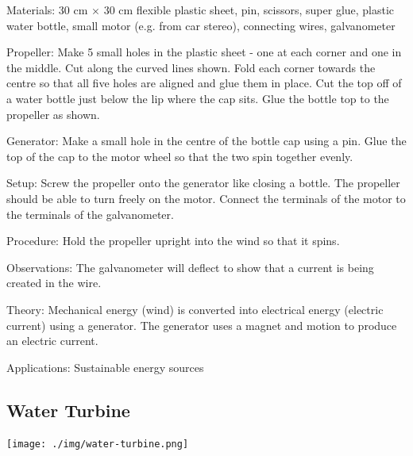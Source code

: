 \begin{multicols}{2}
\begin{description*}
\item[Materials:]{30 cm $\times$ 30 cm flexible plastic sheet, pin, scissors, super glue, plastic water bottle, small motor (e.g. from car stereo), connecting wires, galvanometer}
\item[Propeller:]{Make 5 small holes in the plastic sheet - one at each corner and one in the middle. Cut along the curved lines shown. Fold each corner towards the centre so that all five holes are aligned and glue them in place. Cut the top off of a water bottle just below the lip where the cap sits. Glue the bottle top to the propeller as shown. }
\item[Generator:]{Make a small hole in the centre of the bottle cap using a pin. Glue the top of the cap to the motor wheel so that the two spin together evenly.}
\item[Setup:]{Screw the propeller onto the generator like closing a bottle. The propeller should be able to turn freely on the motor. Connect the terminals of the motor to the terminals of the galvanometer.}
\item[Procedure:]{Hold the propeller upright into the wind so that it spins.}
\item[Observations:]{The galvanometer will deflect to show that a current is being created in the wire.}
\item[Theory:]{Mechanical energy (wind) is converted into electrical energy (electric current) using a generator. The generator uses a magnet and motion to produce an electric current.}
\item[Applications:]{Sustainable energy sources}
\end{description*}

\columnbreak

\subsection{Water Turbine}
\label{sub:water-turbine}

\begin{center}
\texttt{[image: ./img/water-turbine.png]}
\end{center}


\end{multicols}
